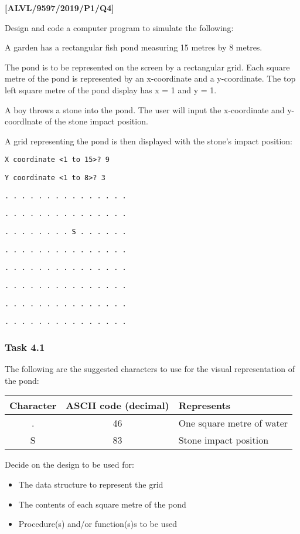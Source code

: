\item \textbf{{[}ALVL/9597/2019/P1/Q4{]} }

Design and code a computer program to simulate the following: 

A garden has a rectangular fish pond measuring 15 metres by 8 metres. 

The pond is to be represented on the screen by a rectangular grid.
Each square metre of the pond is represented by an x-coordinate and
a y-coordinate. The top left square metre of the pond display has
x = 1 and y = 1. 

A boy throws a stone into the pond. The user will input the x-coordinate
and y-coordlnate of the stone impact position. 

A grid representing the pond is then displayed with the stone's impact
position: 

\texttt{X coordinate <1 to 15>? 9 }

\texttt{Y coordinate <1 to 8>? 3 }

\texttt{. . . . . . . . . . . . . . . }

\texttt{. . . . . . . . . . . . . . .}

\texttt{. . . . . . . . S . . . . . .}

\texttt{. . . . . . . . . . . . . . .}

\texttt{. . . . . . . . . . . . . . .}

\texttt{. . . . . . . . . . . . . . .}

\texttt{. . . . . . . . . . . . . . .}

\texttt{. . . . . . . . . . . . . . .}

\subsubsection*{Task 4.1}

The following are the suggested characters to use for the visual representation
of the pond: 
\begin{center}
\begin{tabular}{|c|c|l|}
\hline 
Character & ASCII code (decimal) & \texttt{\hspace{0.01\columnwidth}}Represents\tabularnewline
\hline 
. & 46 & One square metre of water\tabularnewline
\hline 
S & 83 & Stone impact position\tabularnewline
\hline 
\end{tabular}
\par\end{center}

Decide on the design to be used for: 
\begin{itemize}
\item The data structure to represent the grid
\item The contents of each square metre of the pond 
\item Procedure(s) and/or function(s)s to be used 
\end{itemize}

